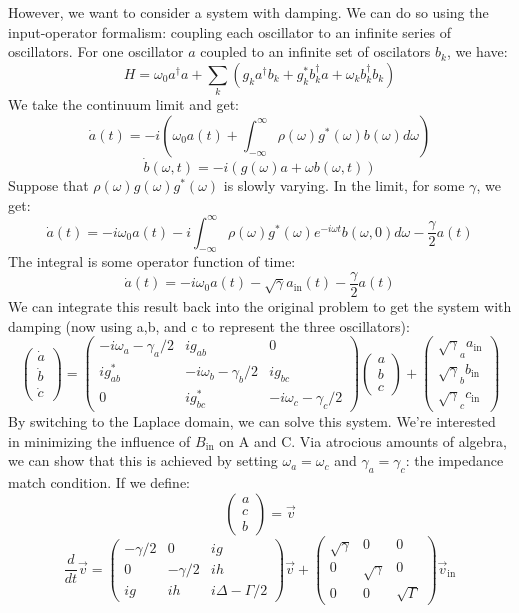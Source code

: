 \documentclass[final]{article}
\begin{document}
However, we want to consider a system with damping.
We can do so using the input-operator formalism: coupling each oscillator to an infinite series of oscillators.
For one oscillator \(a\) coupled to an infinite set of oscilators \(b_k\), we have:
\[H=\omega_0 a^\dagger a+\sum_k (g_k a^\dagger b_k+g_k^* b_k^\dagger a+\omega_k b_k^\dagger b_k)\]
We take the continuum limit and get:
\[\dot a(t)=-i\left(\omega_0 a(t)+\int_{-\infty}^\infty \rho(\omega) g^*(\omega) b(\omega) d\omega\right)\]
\[\dot b(\omega,t)=-i(g(\omega) a+\omega b(\omega,t))\]
Suppose that \(\rho(\omega)g(\omega)g^*(\omega)\) is slowly varying.
In the limit, for some \(\gamma\), we get:
\[\dot a(t)=-i\omega_0 a(t)-i\int_{-\infty}^\infty \rho(\omega) g^*(\omega) 
e^{-i\omega t}b(\omega,0)d\omega- \frac{\gamma}{2} a(t)\]
The integral is some operator function of time:
\[\dot a(t)=-i\omega_0 a(t)-\sqrt{\gamma}a_{\text{in}}(t)- \frac{\gamma}{2} a(t)\]
We can integrate this result back into the original problem to get the system with damping (now using a,b, and c to represent the three oscillators):
\[\begin{pmatrix}\dot a\\\dot b\\\dot c\end{pmatrix}=\begin{pmatrix}-i\omega_a-\gamma_a/2 &ig_{ab} & 0\\ig^*_{ab}&-i\omega_b-\gamma_b/2 & ig_{bc}\\
0& ig^*_{bc}&-i\omega_c-\gamma_c/2\end{pmatrix}\begin{pmatrix}a\\b\\c\end{pmatrix}+
\begin{pmatrix} \sqrt{\gamma}_a a_{\text{in}}\\\sqrt{\gamma}_b b_{\text{in}}\\\sqrt{\gamma}_c c_{\text{in}}\end{pmatrix}\]
By switching to the Laplace domain, we can solve this system.
We're interested in minimizing the influence of \(B_{\text{in}}\) on A and C.
Via atrocious amounts of algebra, we can show that this is achieved by setting \(\omega_a=\omega_c\) and \(\gamma_a=\gamma_c\): the impedance match condition.
If we define:
\[\begin{pmatrix}a\\c\\b\end{pmatrix}=\vec v\]
\[\frac{d}{dt} \vec v=\begin{pmatrix} -\gamma/2 & 0 & ig\\0 & -\gamma/2 & ih\\ig& ih & i\Delta-\Gamma/2\end{pmatrix}\vec v+
\begin{pmatrix} \sqrt{\gamma}&0&0\\0&\sqrt{\gamma}&0\\0&0&\sqrt{\Gamma}\end{pmatrix}\vec v_{\text{in}}\]
\end{document}
